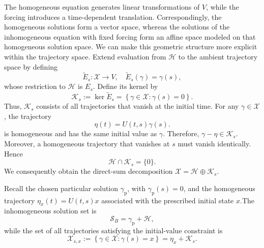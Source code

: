 \documentclass[12pt,a4paper,oneside]{book}
\begin{document}
\begin{example}
\begin{solution}
The homogeneous equation generates linear transformations of $V$, while the forcing introduces a time-dependent translation.
Correspondingly, the homogeneous solutions form a vector space, whereas the solutions of the inhomogeneous equation with
fixed forcing form an affine space modeled on that homogeneous solution space. We can make this geometric structure more
explicit within the trajectory space. Extend evaluation from $\mathcal H$ to the ambient trajectory space by defining
\begin{equation*}
    \widetilde E_s:\mathcal X\to V, \quad \widetilde E_s(\gamma)=\gamma(s),
\end{equation*}
whose restriction to $\mathcal H$ is $E_s$. Define its kernel by
\begin{equation*}
    \mathcal K_s:=\ker\widetilde E_s =
    \left\{
        \gamma\in\mathcal X: \gamma(s)=0
    \right\}.
\end{equation*}
Thus, $\mathcal K_s$ consists of all trajectories that vanish at the initial time. For any $\gamma\in\mathcal X$, the trajectory
\begin{equation*}
    \eta(t)=U(t,s)\gamma(s).
\end{equation*}
is homogeneous and has the same initial value as $\gamma$. Therefore, $\gamma-\eta\in\mathcal K_s$. Moreover, a homogeneous
trajectory that vanishes at $s$ must vanish identically. Hence
\begin{equation*}
    \mathcal H\cap\mathcal K_s=\{0\}.
\end{equation*}
We consequently obtain the direct-sum decomposition $\mathcal X=\mathcal H\oplus\mathcal K_s$.

Recall the chosen particular solution $\gamma_{\mathrm p}$, with $\gamma_{\mathrm p}(s)=0$, and the homogeneous trajectory
$\eta_x(t)=U(t,s)x$ associated with the prescribed initial state $x$.The inhomogeneous solution set is
\begin{equation*}
    \mathcal S_{B}=\gamma_{\mathrm p}+\mathcal H,
\end{equation*}
while the set of all trajectories satisfying the
initial-value constraint is
\begin{equation*}
    \mathcal X_{s,x} :=
        \left\{
            \gamma\in\mathcal X:\gamma(s)=x
        \right\}
        = \eta_x+\mathcal K_s.
\end{equation*}


\end{solution}
\end{example}
\end{document}
